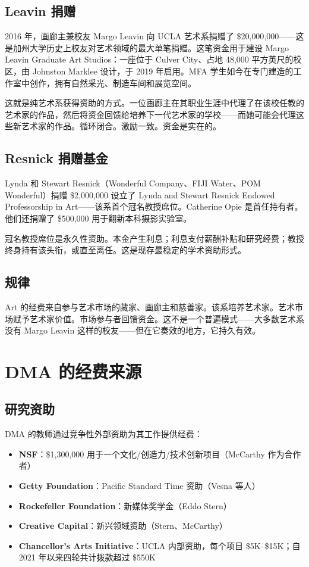 \documentclass[10pt,letterpaper,twocolumn]{article}
\newcommand{\dma}{\textsc{DMA}}
\begin{document}
\subsection{Leavin 捐赠}

2016 年，画廊主兼校友 Margo Leavin 向 UCLA 艺术系捐赠了 \$20{,}000{,}000——这是加州大学历史上校友对艺术领域的最大单笔捐赠。这笔资金用于建设 Margo Leavin Graduate Art Studios：一座位于 Culver City、占地 48,000 平方英尺的校区，由 Johnston Marklee 设计，于 2019 年启用。MFA 学生如今在专门建造的工作室中创作，拥有自然采光、制造车间和展览空间。

这就是纯艺术系获得资助的方式。一位画廊主在其职业生涯中代理了在该校任教的艺术家的作品，然后将资金回馈给培养下一代艺术家的学校——而她可能会代理这些新艺术家的作品。循环闭合。激励一致。资金是实在的。

\subsection{Resnick 捐赠基金}

Lynda 和 Stewart Resnick（Wonderful Company、FIJI Water、POM Wonderful）捐赠 \$2{,}000{,}000 设立了 Lynda and Stewart Resnick Endowed Professorship in Art——该系首个冠名教授席位。Catherine Opie 是首任持有者。他们还捐赠了 \$500{,}000 用于翻新本科摄影实验室。

冠名教授席位是永久性资助。本金产生利息；利息支付薪酬补贴和研究经费；教授终身持有该头衔，或直至离任。这是现存最稳定的学术资助形式。

\subsection{规律}

Art 的经费来自参与艺术市场的藏家、画廊主和慈善家。该系培养艺术家。艺术市场赋予艺术家价值。市场参与者回馈资金。这不是一个普遍模式——大多数艺术系没有 Margo Leavin 这样的校友——但在它奏效的地方，它持久有效。

\section{DMA 的经费来源}

\subsection{研究资助}

\dma{} 的教师通过竞争性外部资助为其工作提供经费：

\begin{itemize}
  \item \textbf{NSF}：\$1{,}300{,}000 用于一个文化/创造力/技术创新项目（McCarthy 作为合作者）
  \item \textbf{Getty Foundation}：Pacific Standard Time 资助（Vesna 等人）
  \item \textbf{Rockefeller Foundation}：新媒体奖学金（Eddo Stern）
  \item \textbf{Creative Capital}：新兴领域资助（Stern、McCarthy）
  \item \textbf{Chancellor's Arts Initiative}：UCLA 内部资助，每个项目 \$5K--\$15K；自 2021 年以来四轮共计拨款超过 \$550K
\end{itemize}
\end{document}

